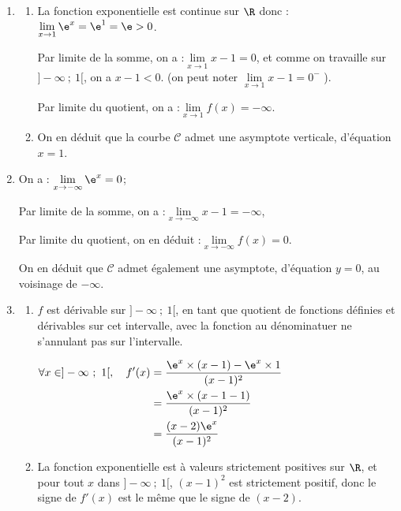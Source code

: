 
\medskip

\begin{enumerate}
\item \begin{enumerate}
		\item La fonction exponentielle est continue sur $\R$ donc :\quad $\lim\limits_{x \to 1} \e^{x} = \e^1 = \e >0$.

		Par limite de la somme, on a :\quad $\lim\limits_{x \to 1} x - 1 = 0$, et comme on travaille sur $]-\infty~;~ 1[ $, on a $x - 1 < 0$. (on peut noter $\lim\limits_{x \to 1} x - 1 = 0^-$ ).

		Par limite du quotient, on a :\quad $\lim\limits_{x \to 1} f(x) = -\infty$.

		\item On en déduit que la courbe $ \mathcal{C} $ admet une asymptote verticale, d'équation $x = 1$.

	\end{enumerate}
	\item On a : \quad $\lim\limits_{x \to -\infty} \e^x = 0$;

	Par limite de la somme, on a :\quad $\lim\limits_{x \to -\infty} x - 1 =-\infty$,

	Par limite du quotient, on en déduit :\quad $\lim\limits_{x \to -\infty} f(x) = 0$.

	On en déduit que $ \mathcal{C} $ admet également une asymptote, d'équation $y = 0$, au voisinage de $ -\infty $.

\item \begin{enumerate}
		\item $f$ est dérivable sur $ ]-\infty ~;~ 1[ $, en tant que quotient de fonctions définies et dérivables sur cet intervalle, avec la fonction au dénominatuer ne s'annulant pas sur l'intervalle.

		$\aligned[t] \forall x \in ]-\infty~;~1[ ,\quad f'(x) & = \dfrac{\e^x \times (x - 1) - \e^x \times 1}{(x-1)^2 }\\
		&= \dfrac{\e^x \times (x - 1 - 1)}{(x-1)^2}\\
		&= \dfrac{(x - 2)\e^x}{(x - 1)^2}\\ \endaligned$

		\item La fonction exponentielle est à valeurs strictement positives sur $\R$, et pour tout $x$ dans $ ]-\infty ~;~ 1[ $, $(x - 1)^2$ est strictement positif, donc le signe de $f'(x)$ est le même que le signe de $(x - 2)$.


\end{enumerate}
\end{enumerate}

